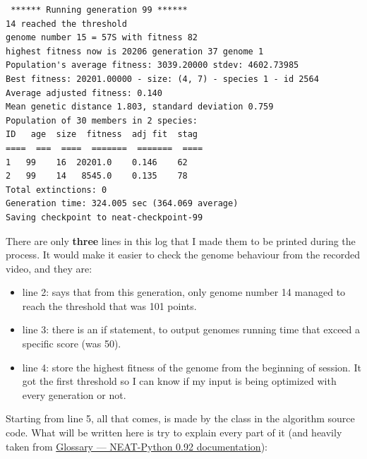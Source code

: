 \begin{listing}[H]
\begin{verbatim}
 ****** Running generation 99 ****** 
14 reached the threshold
genome number 15 = 57S with fitness 82
highest fitness now is 20206 generation 37 genome 1
Population's average fitness: 3039.20000 stdev: 4602.73985
Best fitness: 20201.00000 - size: (4, 7) - species 1 - id 2564
Average adjusted fitness: 0.140
Mean genetic distance 1.803, standard deviation 0.759
Population of 30 members in 2 species:
ID   age  size  fitness  adj fit  stag
====  ===  ====  =======  =======  ====
1   99    16  20201.0    0.146    62
2   99    14   8545.0    0.135    78
Total extinctions: 0
Generation time: 324.005 sec (364.069 average)
Saving checkpoint to neat-checkpoint-99
\end{verbatim}
\end{listing}

 There are only \textbf{three} lines in this log that I made them to be printed during the process. It would make it easier to check the genome behaviour from the recorded video, and they are:
 \begin{itemize}
\item line 2: says that from this generation, only genome number 14 managed to reach the threshold that was 101 points.
\item line 3: there is an if statement, to output genomes running time that exceed a specific score (was 50).
\item line 4: store the highest fitness of the genome from the beginning of session. It got the first threshold so I can know if my input is being optimized with every generation or not.
 \end{itemize}

Starting from line 5, all that comes, is made by the  class in the algorithm source code. What will be written here is try to explain every part of it (and heavily taken from \href{https://neat-python.readthedocs.io/en/latest/glossary.html}{Glossary — NEAT-Python 0.92 documentation}):


